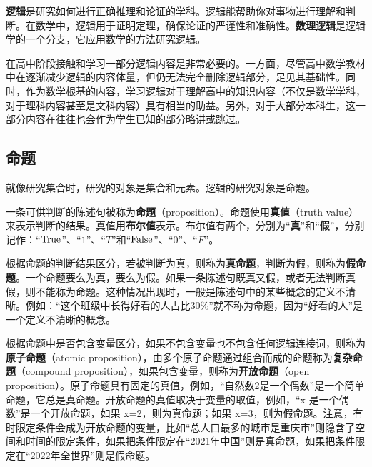
\begin{issues}
\issueDraft
\end{issues}

\textbf{逻辑}是研究如何进行正确推理和论证的学科。逻辑能帮助你对事物进行理解和判断。在数学中，逻辑用于证明定理，确保论证的严谨性和准确性。\textbf{数理逻辑}是逻辑学的一个分支，它应用数学的方法研究逻辑。

在高中阶段接触和学习一部分逻辑内容是非常必要的。一方面，尽管高中数学教材中在逐渐减少逻辑的内容体量，但仍无法完全删除逻辑部分，足见其基础性。同时，作为数学根基的内容，学习逻辑对于理解高中的知识内容（不仅是数学学科，对于理科内容甚至是文科内容）具有相当的助益。另外，对于大部分本科生，这一部分内容在往往也会作为学生已知的部分略讲或跳过。

\subsection{命题}

就像研究集合时，研究的对象是集合和元素。逻辑的研究对象是命题。

一条可供判断的陈述句被称为\textbf{命题}（proposition）。命题使用\textbf{真值}（truth value）来表示判断的结果。真值用\textbf{布尔值}表示。布尔值有两个，分别为“\textbf{真}”和“\textbf{假}”，分别记作：“${\rm True}$”、“$1$”、“$T$”和“${\rm False}$”、“$0$”、“$F$”。

根据命题的判断结果区分，若被判断为真，则称为\textbf{真命题}，判断为假，则称为\textbf{假命题}。一个命题要么为真，要么为假。如果一条陈述句既真又假，或者无法判断真假，则不能称为命题。这种情况出现时，一般是陈述句中的某些概念的定义不清晰。例如：“这个班级中长得好看的人占比$30\%$”就不称为命题，因为“好看的人”是一个定义不清晰的概念。

根据命题中是否包含变量区分，如果不包含变量也不包含任何逻辑连接词，则称为\textbf{原子命题}（atomic proposition），由多个原子命题通过组合而成的命题称为\textbf{复杂命题}（compound proposition），如果包含变量，则称为\textbf{开放命题}（open proposition）。原子命题具有固定的真值，例如，“自然数2是一个偶数”是一个简单命题，它总是真命题。开放命题的真值取决于变量的取值，例如，“x 是一个偶数”是一个开放命题，如果 x=2，则为真命题；如果 x=3，则为假命题。注意，有时限定条件会成为开放命题的变量，比如“总人口最多的城市是重庆市”则隐含了空间和时间的限定条件，如果把条件限定在“2021年中国”则是真命题，如果把条件限定在“2022年全世界”则是假命题。

